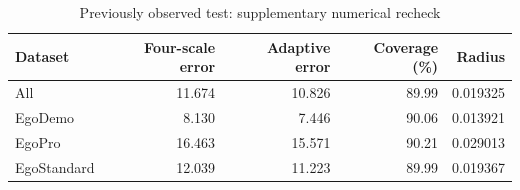 \begin{table}[htbp]
\centering
\small
\caption{Previously observed test: supplementary numerical recheck}
\label{tab:test_supplement}
\setlength{\tabcolsep}{4pt}
\begin{tabular}{lrrrr}
\toprule
Dataset & Four-scale error & Adaptive error & Coverage (\%) & Radius\\
\midrule
All & 11.674 & 10.826 & 89.99 & 0.019325\\
EgoDemo & 8.130 & 7.446 & 90.06 & 0.013921\\
EgoPro & 16.463 & 15.571 & 90.21 & 0.029013\\
EgoStandard & 12.039 & 11.223 & 89.99 & 0.019367\\
\bottomrule
\end{tabular}
\end{table}
